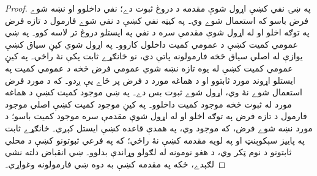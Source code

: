\documentclass[../../../include/open-logic-section]{subfiles}
\begin{document}
\begin{proof}
  په ښۍ نفي کښې اړول شوې مقدمه د دروغ ثبوت دے؛ نفي داخلوو
  او نښه شوے فرض باسو که استعمال شوے وي۔ په کيڼه نفي کښې
  د نفي شوے فارمول د تازه فرض په توګه اخلو او له اړول شوې
  مقدمې سره د نفي په ايستلو دروغ تر لاسه کوو۔
  په ښي عمومي کميت کښې د عمومي کميت داخلول کاروو۔ په اړول
  شوي کيڼ سياق کښې يوازې له اصلي سياق څخه فارمولونه پاتې دي،
  نو ځانګړے ثابت پکې نۀ راځي۔ په کيڼ عمومي کميت کښې له يوه
  تازه نښه شوي عمومي فرض څخه د عمومي کميت په ايستلو اړوند
  مورد ثابتوو او د هماغه مورد د فرض پر ځاے يې ږدو۔ که د مورد
  فرض استعمال شوے نۀ وي، اړول شوے ثبوت بس دے۔
  په ښي موجود کميت کښې د هماغه مورد له ثبوت څخه موجود کميت
  داخلوو۔ په کيڼ موجود کميت کښې اصلي موجود فارمول د تازه فرض
  په توګه اخلو او له اړول شوې مقدمې سره موجود کميت باسو؛
  د مورد نښه شوے فرض، که موجود وي، په همدې قاعده کښې ايستل کېږي۔
  ځانګړے ثابت په پاييز سېکوېنټ او په لويه مقدمه کښې نۀ راځي؛
  که په فرعي ثبوتونو کښې د محلي ثابتونو د نوم ټکر وي، د هغو
  نومونه له لګولو وړاندې بدلوو۔ ښي انقباض دلته نشي لګېدے،
  ځکه په مقدمه کښې به دوه ښي فارمولونه وغواړي۔
\end{proof}
\end{document}
